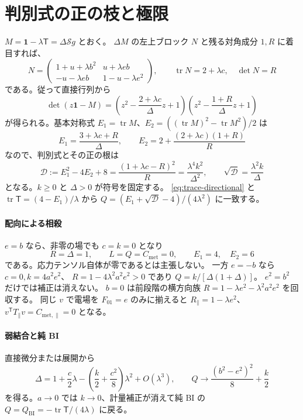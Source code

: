 \documentclass[11pt,a4paper]{article}
\newcommand{\tr}{\operatorname{tr}}
\newcommand{\Id}{\mathbf{1}}
\newcommand{\Tmix}{\mathsf{T}}
\newcommand{\Sinv}{\mathcal S}
\newcommand{\Qbi}{Q_{\mathrm{BI}}}
\newcommand{\Cmet}{C_{\mathrm{met}}}
\begin{document}
\section{判別式の正の枝と極限}
$M=\Id-\lambda\Tmix=\Delta\Sinv g$ とおく。
$\Delta M$ の左上ブロック $N$ と残る対角成分 $1,R$ に着目すれば、
\begin{equation}\label{eq:N}
N=\begin{pmatrix}
1+u+\lambda b^2&u+\lambda eb\\
-u-\lambda eb&1-u-\lambda e^2
\end{pmatrix},\qquad \tr N=2+\lambda c,\quad \det N=R
\end{equation}
である。従って直接行列から
\begin{equation}\label{eq:twofield-char}
\det(z\Id-M)
=\left(z^2-\frac{2+\lambda c}{\Delta}z+1\right)
 \left(z^2-\frac{1+R}{\Delta}z+1\right)
\end{equation}
が得られる。基本対称式 $E_1=\tr M$、$E_2=((\tr M)^2-\tr M^2)/2$ は
\begin{equation}\label{eq:E-twofield}
E_1=\frac{3+\lambda c+R}{\Delta},\qquad
E_2=2+\frac{(2+\lambda c)(1+R)}{R}
\end{equation}
なので、判別式とその正の根は
\begin{equation}\label{eq:disc-twofield}
\mathcal D:=E_1^2-4E_2+8
=\frac{(1+\lambda c-R)^2}{R}=\frac{\lambda^4k^2}{\Delta^2},\qquad
\sqrt{\mathcal D}=\frac{\lambda^2k}{\Delta}
\end{equation}
となる。$k\geq0$ と $\Delta>0$ が符号を固定する。
\eqref{eq:trace-directional} と $\tr\Tmix=(4-E_1)/\lambda$ から
$Q=(E_1+\sqrt{\mathcal D}-4)/(4\lambda^2)$ に一致する。

\paragraph{配向による相殺}
$e=b$ なら、非零の場でも $c=k=0$ となり
\begin{equation}\label{eq:equal}
R=\Delta=1,\qquad L=Q=\Cmet=0,\qquad E_1=4,\quad E_2=6
\end{equation}
である。応力テンソル自体が零であるとは主張しない。
一方 $e=-b$ なら $c=0,k=4a^2e^2$、
$R=1-4\lambda^2a^2e^2>0$ であり $Q=k/[\Delta(1+\Delta)]$。
$e^2=b^2$ だけでは補正は消えない。
$b=0$ は前段階の横方向族
$R=1-\lambda e^2-\lambda^2a^2e^2$ を回収する。
同じ $v$ で電場を $F_{01}=e$ のみに揃えると
$R_\parallel=1-\lambda e^2$、$v^{\mathsf T}T_\parallel v=C_{\mathrm{met},\parallel}=0$ となる。

\paragraph{弱結合と純 BI}
直接微分または展開から
\begin{equation}\label{eq:weak}
\Delta=1+\frac c2\lambda-\left(\frac k2+\frac{c^2}{8}\right)\lambda^2+O(\lambda^3),
\qquad Q\longrightarrow\frac{(b^2-e^2)^2}{8}+\frac k2
\end{equation}
を得る。$a\to0$ では $k\to0$、計量補正が消えて純 BI の
$Q=\Qbi=-\tr\Tmix/(4\lambda)$ に戻る。
\end{document}
